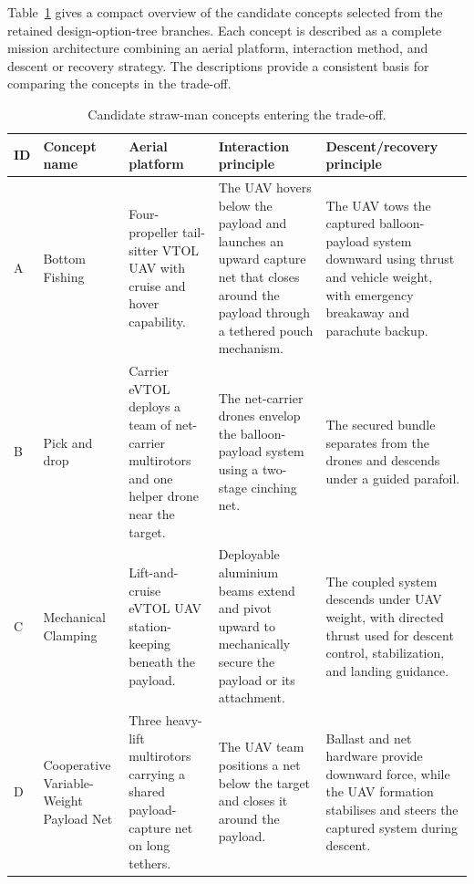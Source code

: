Table~\ref{tab:strawman_concept_overview} gives a compact overview of the candidate concepts selected from the retained design-option-tree branches. Each concept is described as a complete mission architecture combining an aerial platform, interaction method, and descent or recovery strategy. The descriptions provide a consistent basis for comparing the concepts in the trade-off. 

\begin{table}[H]
    \centering
    \small
    \caption{Candidate straw-man concepts entering the trade-off.}
    \label{tab:strawman_concept_overview}
    \begin{tabularx}{\textwidth}{@{}p{} p{} X X X@{}}
        \toprule
        \textbf{ID} 
        & \textbf{Concept name} 
        & \textbf{Aerial platform} 
        & \textbf{Interaction principle} 
        & \textbf{Descent/recovery principle} \\
        \midrule

        A 
        & Bottom Fishing
        & Four-propeller tail-sitter VTOL UAV with cruise and hover capability.
        & The UAV hovers below the payload and launches an upward capture net that closes around the payload through a tethered pouch mechanism.
        & The UAV tows the captured balloon-payload system downward using thrust and vehicle weight, with emergency breakaway and parachute backup. \\

        B 
        & Pick and drop
        & Carrier eVTOL deploys a team of net-carrier multirotors and one helper drone near the target.
        & The net-carrier drones envelop the balloon-payload system using a two-stage cinching net.
        & The secured bundle separates from the drones and descends under a guided parafoil. \\

        C 
        & Mechanical Clamping
        & Lift-and-cruise eVTOL UAV station-keeping beneath the payload.
        & Deployable aluminium beams extend and pivot upward to mechanically secure the payload or its attachment.
        & The coupled system descends under UAV weight, with directed thrust used for descent control, stabilization, and landing guidance. \\

        D 
        & Cooperative Variable-Weight Payload Net
        & Three heavy-lift multirotors carrying a shared payload-capture net on long tethers.
        & The UAV team positions a net below the target and closes it around the payload.
        & Ballast and net hardware provide downward force, while the UAV formation stabilises and steers the captured system during descent. \\


\end{tabularx}
\end{table}
